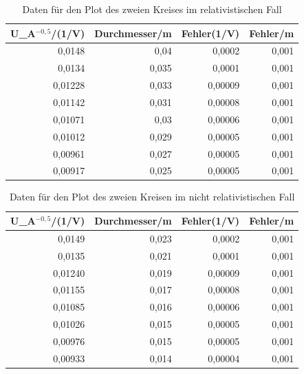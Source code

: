 \documentclass[12pt,a4paper]{article}
\begin{document}
\begin{table}[htbp]
\caption{Daten für den Plot des zweien Kreises im relativistischen Fall}
\begin{center}
\begin{tabular}{|r|r|r|r|}
\hline
\multicolumn{1}{|l|}{U\_A$^{-0,5}$/(1/V)} & \multicolumn{1}{l|}{Durchmesser/m} & \multicolumn{1}{l|}{Fehler(1/V)} & \multicolumn{1}{l|}{Fehler/m} \\ \hline
0,0148 & 0,04 & 0,0002 & 0,001 \\ \hline
0,0134 & 0,035 & 0,0001 & 0,001 \\ \hline
0,01228 & 0,033 & 0,00009 & 0,001 \\ \hline
0,01142 & 0,031 & 0,00008 & 0,001 \\ \hline
0,01071 & 0,03 & 0,00006 & 0,001 \\ \hline
0,01012 & 0,029 & 0,00005 & 0,001 \\ \hline
0,00961 & 0,027 & 0,00005 & 0,001 \\ \hline
0,00917 & 0,025 & 0,00005 & 0,001 \\ \hline
\end{tabular}
\end{center}
\label{tab:p_2_r}
\end{table}

\begin{table}[htbp]
\caption{Daten für den Plot des zweien Kreisen im nicht relativistischen Fall}
\begin{center}
\begin{tabular}{|r|r|r|r|}
\hline
\multicolumn{1}{|l|}{U\_A$^{-0,5}$/(1/V)} & \multicolumn{1}{l|}{Durchmesser/m} & \multicolumn{1}{l|}{Fehler(1/V)} & \multicolumn{1}{l|}{Fehler/m} \\ \hline
0,0149 & 0,023 & 0,0002 & 0,001 \\ \hline
0,0135 & 0,021 & 0,0001 & 0,001 \\ \hline
0,01240 & 0,019 & 0,00009 & 0,001 \\ \hline
0,01155 & 0,017 & 0,00008 & 0,001 \\ \hline
0,01085 & 0,016 & 0,00006 & 0,001 \\ \hline
0,01026 & 0,015 & 0,00005 & 0,001 \\ \hline
0,00976 & 0,015 & 0,00005 & 0,001 \\ \hline
0,00933 & 0,014 & 0,00004 & 0,001 \\ \hline
\end{tabular}
\end{center}
\label{tab:p_1}
\end{table}
\end{document}
